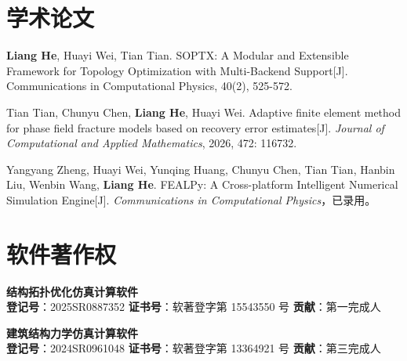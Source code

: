 \documentclass[11pt]{article}
\newlength{\iconwidth}
\begin{document}
	\begin{minipage}[t]{\textwidth}
		\section[学术论文]{\makebox[\iconwidth][c]{\color{primary_color}{\faFile}}\quad 学术论文}
		
		\vspace{0.5em}
		
		\begin{enumerate}[label={[\arabic*]}, leftmargin=2.5em]
			\setlength{\itemsep}{0.2em}
			
			\item \textbf{Liang He}, Huayi Wei, Tian Tian. SOPTX: A Modular and Extensible Framework for Topology Optimization with Multi-Backend Support[J]. Communications in Computational Physics, 40(2), 525-572.
			
			\item Tian Tian, Chunyu Chen, \textbf{Liang He}, Huayi Wei. Adaptive finite element method for phase field fracture models based on recovery error estimates[J]. \textit{Journal of Computational and Applied Mathematics}, 2026, 472: 116732.
			
			\item Yangyang Zheng, Huayi Wei, Yunqing Huang, Chunyu Chen, Tian Tian, Hanbin Liu, Wenbin Wang, \textbf{Liang He}. FEALPy: A Cross-platform Intelligent Numerical Simulation Engine[J]. \textit{Communications in Computational Physics}，已录用。
		\end{enumerate}
		
		\vspace{0.6em}
	\end{minipage}
	
	\begin{minipage}[t]{\textwidth}
		\section[软件著作权]{\makebox[\iconwidth][c]{\color{primary_color}{\faCopyright}}\quad 软件著作权}
		
		\vspace{0.5em}
		
		\begin{enumerate}[label={[\arabic*]}, leftmargin=2.5em]
			\setlength{\itemsep}{0.2em}
			
			\item \textbf{结构拓扑优化仿真计算软件}\\[0.3em]
			\textbf{登记号}：2025SR0887352 \qquad \textbf{证书号}：软著登字第 15543550 号 \qquad \textbf{贡献}：第一完成人
			
			\item \textbf{建筑结构力学仿真计算软件}\\[0.3em]
			\textbf{登记号}：2024SR0961048 \qquad \textbf{证书号}：软著登字第 13364921 号 \qquad \textbf{贡献}：第三完成人
		\end{enumerate}
		
		\vspace{0.6em}
	\end{minipage}
\end{document}
